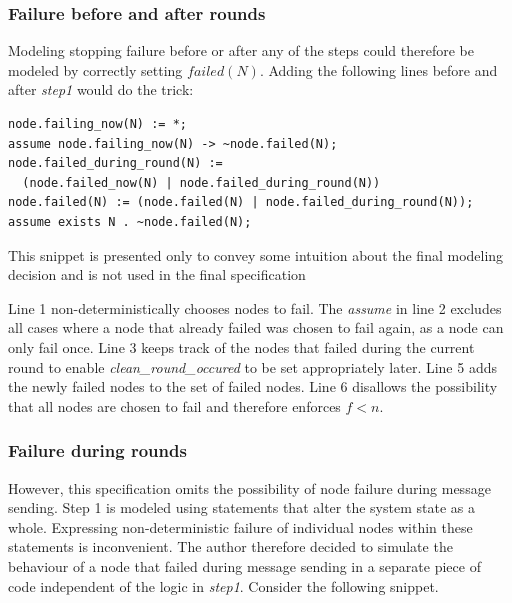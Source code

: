 \documentclass[fleqn]{article}
\begin{document}
\subsubsection{Failure before and after rounds}

\noindent Modeling stopping failure before or after any of the steps could therefore be modeled by correctly setting $failed(N)$. Adding the following lines before and after \textit{step1} would do the trick:

\begin{mdframed}[nobreak=true, backgroundcolor=light-gray, roundcorner=10pt,leftmargin=1, rightmargin=1, innerleftmargin=15, innertopmargin=15,innerbottommargin=15, outerlinewidth=1, linecolor=light-gray]
\begin{lstlisting}
node.failing_now(N) := *;
assume node.failing_now(N) -> ~node.failed(N);
node.failed_during_round(N) :=
  (node.failed_now(N) | node.failed_during_round(N))
node.failed(N) := (node.failed(N) | node.failed_during_round(N));
assume exists N . ~node.failed(N);
\end{lstlisting}
\end{mdframed}

\noindent This snippet is presented only to convey some intuition about the final modeling decision and is not used in the final specification

Line 1 non-deterministically chooses nodes to fail. The \textit{assume} in line 2 excludes all
cases where a node that already failed was chosen to fail again, as a node can only fail once. Line 3 keeps track of the nodes that failed during the current round to enable \textit{clean\_round\_occured} to be set appropriately later. Line 5 adds the newly failed nodes to the set of failed nodes. Line 6 disallows the possibility that all nodes are chosen to fail and therefore enforces $f < n$.

\subsubsection{Failure during rounds}

However, this specification omits the possibility of node failure during message sending. Step 1 is modeled using statements that alter the system state as a whole. Expressing non-deterministic failure of individual nodes within these statements is inconvenient. The author therefore decided to simulate the behaviour of a node that failed during message sending in a separate piece of code independent of the logic in \textit{step1}. Consider the following snippet.
\end{document}

